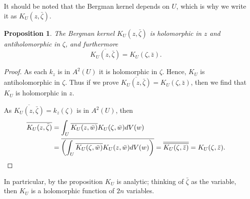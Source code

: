 \documentclass[12pt,openany]{book}
\theoremstyle{plain}
\newtheorem{prop}[thm]{Proposition}
\theoremstyle{remark}
\theoremstyle{definition}
\theoremstyle{exercise}
\theoremstyle{example}
\begin{document}
It should be noted that the Bergman kernel depends on $U$, which is why we write it
as $K_U(z,\bar{\zeta})$.

\begin{prop}
The Bergman kernel $K_U(z,\bar{\zeta})$ is holomorphic in $z$ and
antiholomorphic in $\zeta$, and furthermore
\begin{equation*}
\overline{K_U(z,\bar{\zeta})} = K_U(\zeta,\bar{z}) .
\end{equation*}
\end{prop}

\begin{proof}
As each $k_z$ is in $A^2(U)$ it is holomorphic in $\zeta$.  Hence, $K_U$ is
antiholomorphic in $\zeta$.  Thus if we prove
$\overline{K_U(z,\bar{\zeta})} = K_U(\zeta,\bar{z})$, then we find that $K_U$
is holomorphic in $z$.

As $\overline{K_U(z,\bar{\zeta})} = k_z(\zeta)$ is in $A^2(U)$, then
\begin{equation*}
\begin{split}
\overline{K_U(z,\bar{\zeta})}
& =
\int_{U} \overline{K_U(z,\bar{w})} K_U(\zeta,\bar{w}) dV(w)
\\
& =
\overline{
\left(
\int_{U} \overline{K_U(\zeta,\bar{w})} K_U(z,\bar{w}) dV(w)
\right)
}
=
\overline{
\overline{
K_U(\zeta,\bar{z})
}}
=
K_U(\zeta,\bar{z}) . \qedhere
\end{split}
\end{equation*}
\end{proof}

In partricular, by the proposition $K_U$ is analytic; thinking of
$\bar{\zeta}$ as the variable, then $K_U$ is a holomorphic function of
$2n$ variables.
\end{document}
